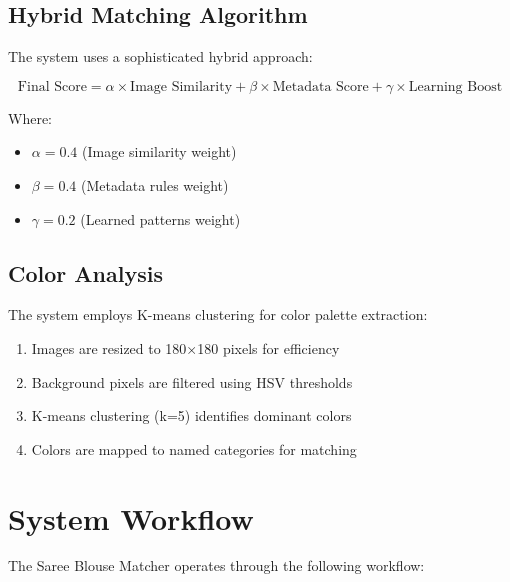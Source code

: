 \documentclass[12pt,a4paper]{report}
\begin{document}
\subsection{Hybrid Matching Algorithm}

The system uses a sophisticated hybrid approach:

\begin{equation}
\text{Final Score} = \alpha \times \text{Image Similarity} + \beta \times \text{Metadata Score} + \gamma \times \text{Learning Boost}
\end{equation}

Where:
\begin{itemize}
    \item $\alpha = 0.4$ (Image similarity weight)
    \item $\beta = 0.4$ (Metadata rules weight)
    \item $\gamma = 0.2$ (Learned patterns weight)
\end{itemize}

\subsection{Color Analysis}

The system employs K-means clustering for color palette extraction:

\begin{enumerate}
    \item Images are resized to 180×180 pixels for efficiency
    \item Background pixels are filtered using HSV thresholds
    \item K-means clustering (k=5) identifies dominant colors
    \item Colors are mapped to named categories for matching
\end{enumerate}

\section{System Workflow}

The Saree Blouse Matcher operates through the following workflow:
\end{document}
